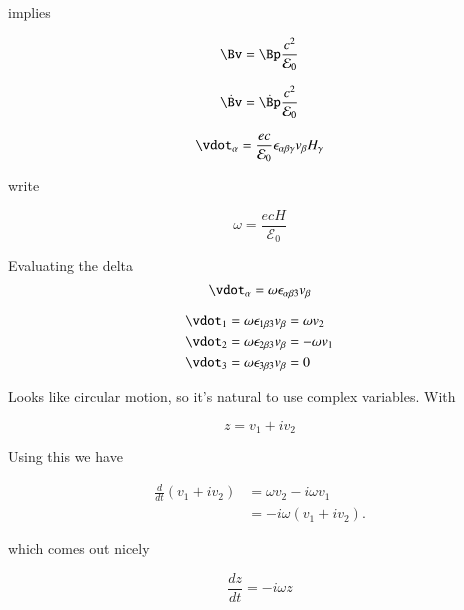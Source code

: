 implies

\begin{equation}\label{eqn:relativisticElectrodynamicsT3:620}
\Bv = \Bp \frac{c^2}{\mathcal{E}_0}
\end{equation}

\begin{equation}\label{eqn:relativisticElectrodynamicsT3:640}
\dot{\Bv} = \dot{\Bp} \frac{c^2}{\mathcal{E}_0}
\end{equation}

\begin{equation}\label{eqn:relativisticElectrodynamicsT3:660}
\vdot_\alpha = \frac{e c}{\mathcal{E}_0} \epsilon_{\alpha \beta \gamma} v_\beta H_\gamma
\end{equation}

write

\begin{equation}\label{eqn:relativisticElectrodynamicsT3:680}
\omega = \frac{e c H}{\mathcal{E}_0}
\end{equation}

Evaluating the delta 
\begin{equation}\label{eqn:relativisticElectrodynamicsT3:700}
\vdot_\alpha = \omega \epsilon_{\alpha \beta 3} v_\beta 
\end{equation}

\begin{align}\label{eqn:relativisticElectrodynamicsT3:720}
\vdot_1 &= \omega \epsilon_{1 \beta 3} v_\beta = \omega v_2 \\
\vdot_2 &= \omega \epsilon_{2 \beta 3} v_\beta = - \omega v_1 \\
\vdot_3 &= \omega \epsilon_{3 \beta 3} v_\beta = 0
\end{align}

Looks like circular motion, so it's natural to use complex variables.  With

\begin{equation}\label{eqn:relativisticElectrodynamicsT3:740}
z = v_1 + i v_2 
\end{equation}

Using this we have

\begin{align*}
\frac{d}{dt} ( v_1 + i v_2 ) 
&= 
\omega v_2 - i \omega v_1  \\
&= -i \omega ( v_1 + i v_2 ).
\end{align*}

which comes out nicely

\begin{equation}\label{eqn:relativisticElectrodynamicsT3:751}
\frac{dz}{dt} = -i \omega z
\end{equation}

